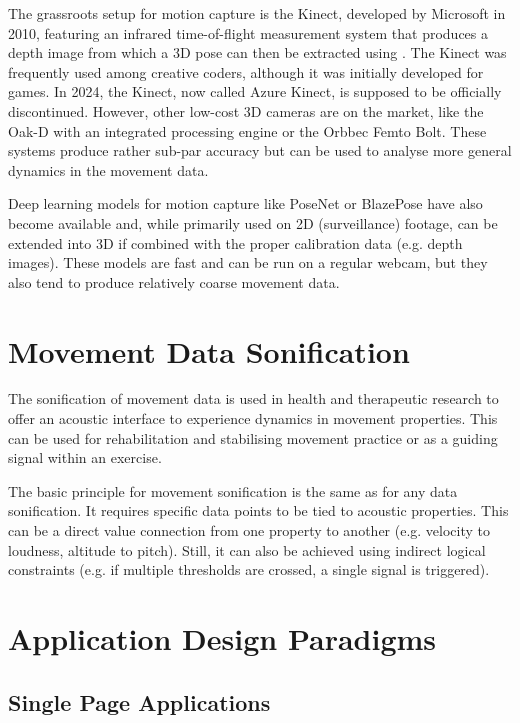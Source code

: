 The grassroots setup for motion capture is the Kinect, developed by Microsoft in 2010, featuring an infrared time-of-flight measurement system that produces a depth image from which a 3D pose can then be extracted using . The Kinect was frequently used among creative coders, although it was initially developed for games. In 2024, the Kinect, now called Azure Kinect, is supposed to be officially discontinued. However, other low-cost 3D cameras are on the market, like the Oak-D with an integrated processing engine or the Orbbec Femto Bolt. These systems produce rather sub-par accuracy but can be used to analyse more general dynamics in the movement data.

Deep learning models for motion capture like PoseNet or BlazePose have also become available and, while primarily used on 2D (surveillance) footage, can be extended into 3D if combined with the proper calibration data (e.g. depth images). These models are fast and can be run on a regular webcam, but they also tend to produce relatively coarse movement data.

\section{Movement Data Sonification}

The sonification of movement data is used in health and therapeutic research to offer an acoustic interface to experience dynamics in movement properties. This can be used for rehabilitation and stabilising movement practice or as a guiding signal within an exercise.

The basic principle for movement sonification is the same as for any data sonification. It requires specific data points to be tied to acoustic properties. This can be a direct value connection from one property to another (e.g. velocity to loudness, altitude to pitch). Still, it can also be achieved using indirect logical constraints (e.g. if multiple thresholds are crossed, a single signal is triggered). 

\section{Application Design Paradigms}

\subsection{Single Page Applications}

